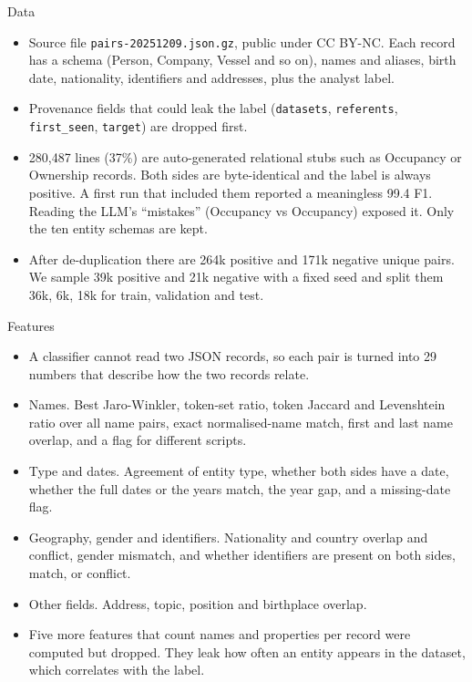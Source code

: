 \documentclass[aspectratio=169,10pt]{beamer}
\begin{document}
\begin{frame}{Data}
\begin{itemize}
\item Source file \texttt{pairs-20251209.json.gz}, public under CC BY-NC. Each record has a schema (Person, Company, Vessel and so on), names and aliases, birth date, nationality, identifiers and addresses, plus the analyst label.
\item Provenance fields that could leak the label (\texttt{datasets}, \texttt{referents}, \texttt{first\_seen}, \texttt{target}) are dropped first.
\item 280{,}487 lines (37\%) are auto-generated relational stubs such as Occupancy or Ownership records. Both sides are byte-identical and the label is always positive. A first run that included them reported a meaningless 99.4 F1. Reading the LLM's ``mistakes'' (Occupancy vs Occupancy) exposed it. Only the ten entity schemas are kept.
\item After de-duplication there are 264k positive and 171k negative unique pairs. We sample 39k positive and 21k negative with a fixed seed and split them 36k, 6k, 18k for train, validation and test.
\end{itemize}
\end{frame}

\begin{frame}{Features}
\begin{itemize}
\item A classifier cannot read two JSON records, so each pair is turned into 29 numbers that describe how the two records relate.
\item Names. Best Jaro-Winkler, token-set ratio, token Jaccard and Levenshtein ratio over all name pairs, exact normalised-name match, first and last name overlap, and a flag for different scripts.
\item Type and dates. Agreement of entity type, whether both sides have a date, whether the full dates or the years match, the year gap, and a missing-date flag.
\item Geography, gender and identifiers. Nationality and country overlap and conflict, gender mismatch, and whether identifiers are present on both sides, match, or conflict.
\item Other fields. Address, topic, position and birthplace overlap.
\item Five more features that count names and properties per record were computed but dropped. They leak how often an entity appears in the dataset, which correlates with the label.
\end{itemize}
\end{frame}
\end{document}
